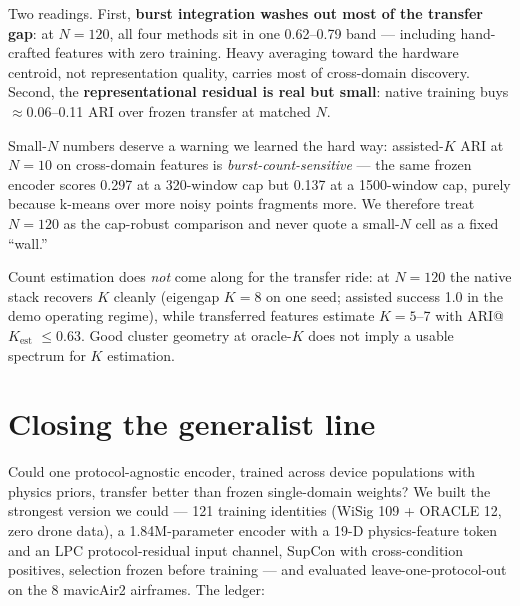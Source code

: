 \documentclass[conference]{IEEEtran}
\begin{document}
Two readings. First, \textbf{burst integration washes out most of the transfer gap}: at
$N{=}120$, all four methods sit in one 0.62--0.79 band --- including hand-crafted features with
zero training. Heavy averaging toward the hardware centroid, not representation quality, carries
most of cross-domain discovery. Second, the \textbf{representational residual is real but
small}: native training buys $\approx$0.06--0.11 ARI over frozen transfer at matched $N$.

Small-$N$ numbers deserve a warning we learned the hard way: assisted-$K$ ARI at $N{=}10$ on
cross-domain features is \emph{burst-count-sensitive} --- the same frozen encoder scores 0.297 at
a 320-window cap but 0.137 at a 1500-window cap, purely because k-means over more noisy points
fragments more. We therefore treat $N{=}120$ as the cap-robust comparison and never quote a
small-$N$ cell as a fixed ``wall.''

Count estimation does \emph{not} come along for the transfer ride: at $N{=}120$ the native
stack recovers $K$ cleanly (eigengap $K{=}8$ on one seed; assisted success 1.0 in the demo
operating regime), while transferred features estimate $K{=}5$--7 with ARI@$K_{\mathrm{est}}$
$\le 0.63$. Good cluster geometry at oracle-$K$ does not imply a usable spectrum for $K$
estimation.

\section{Closing the generalist line}
\label{sec:generalist}

Could one protocol-agnostic encoder, trained across device populations with physics priors,
transfer better than frozen single-domain weights? We built the strongest version we could ---
121 training identities (WiSig 109 + ORACLE 12, zero drone data), a 1.84M-parameter encoder with
a 19-D physics-feature token and an LPC protocol-residual input channel, SupCon with
cross-condition positives, selection frozen before training --- and evaluated leave-one-protocol-out
on the 8 mavicAir2 airframes. The ledger:
\end{document}
